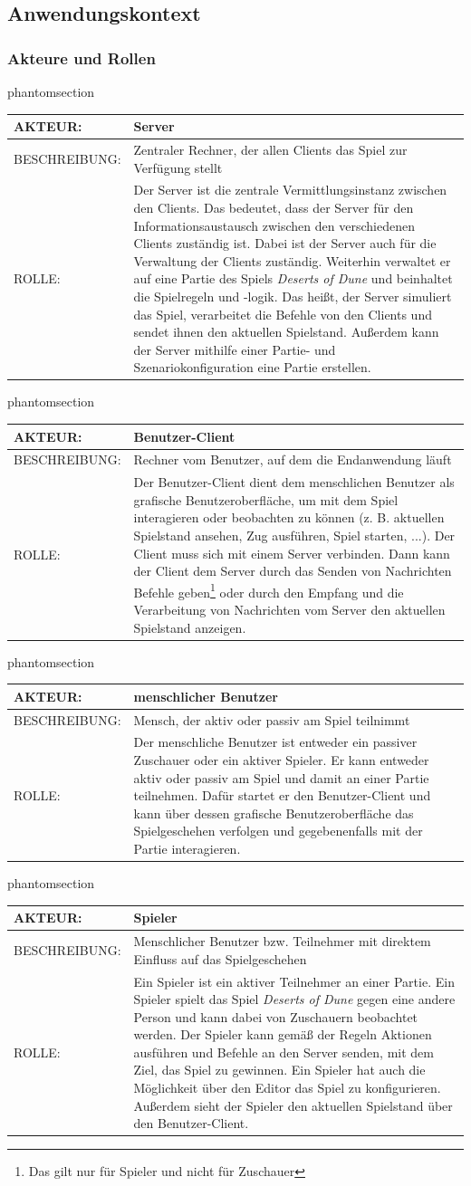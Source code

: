 \documentclass[12pt]{article}
\makeatletter
\newcommand{\labeltext}[2]{%
  \@bsphack
  \csname phantomsection\endcsname %
  \def\@currentlabel{#1}{\label{#2}}%
  \@esphack
}
\newcounter{fa}
\newcounter{nfa}
\newcommand{\akteur}[4]{
\labeltext{#2}{#1}
\begin{tabularx}{16cm}{|l|X|}
\hline 
AKTEUR: & #2 \\
\hline
BESCHREIBUNG: & #3 \\
\hline
ROLLE: & #4 \\ 
\hline
\end{tabularx}
}
\makeatother
\begin{document}
\subsection{Anwendungskontext}
\subsubsection{Akteure und Rollen}

\akteur{A-Server}{Server}{Zentraler Rechner, der allen Clients das Spiel zur Verfügung stellt}{Der Server ist die zentrale Vermittlungsinstanz zwischen den Clients. Das bedeutet, dass der Server für den Informationsaustausch zwischen den verschiedenen Clients zuständig ist. Dabei ist der Server auch für die Verwaltung der Clients zuständig. Weiterhin verwaltet er auf eine Partie des Spiels \textit{Deserts of Dune} und beinhaltet die Spielregeln und -logik. Das heißt, der Server simuliert das Spiel, verarbeitet die Befehle von den Clients und sendet ihnen den aktuellen Spielstand. Außerdem kann der Server mithilfe einer Partie- und Szenariokonfiguration eine Partie erstellen.}

\akteur{A-Benutzer-Client}{Benutzer-Client}{Rechner vom Benutzer, auf dem die Endanwendung läuft}{Der Benutzer-Client dient dem menschlichen Benutzer als grafische Benutzeroberfläche, um mit dem Spiel interagieren oder beobachten zu können (z. B. aktuellen Spielstand ansehen, Zug ausführen, Spiel starten, ...). Der Client muss sich mit einem Server verbinden. Dann kann der Client dem Server durch das Senden von Nachrichten Befehle geben\footnote{Das gilt nur für Spieler und nicht für Zuschauer} oder durch den Empfang und die Verarbeitung von Nachrichten vom Server den aktuellen Spielstand anzeigen.}

\akteur{A-Benutzer}{menschlicher Benutzer}{Mensch, der aktiv oder passiv am Spiel teilnimmt}{Der menschliche Benutzer ist entweder ein passiver Zuschauer oder ein aktiver Spieler. Er kann entweder aktiv oder passiv am Spiel und damit an einer Partie teilnehmen. Dafür startet er den Benutzer-Client und kann über dessen grafische Benutzeroberfläche das Spielgeschehen verfolgen und gegebenenfalls mit der Partie interagieren.}

\akteur{A-Spieler}{Spieler}{Menschlicher Benutzer bzw. Teilnehmer mit direktem Einfluss auf das Spielgeschehen}{Ein Spieler ist ein aktiver Teilnehmer an einer Partie. Ein Spieler spielt das Spiel \textit{Deserts of Dune} gegen eine andere Person und kann dabei von Zuschauern beobachtet werden. Der Spieler kann gemäß der Regeln Aktionen ausführen und Befehle an den Server senden, mit dem Ziel, das Spiel zu gewinnen. Ein Spieler hat auch die Möglichkeit über den Editor das Spiel zu konfigurieren. Außerdem sieht der Spieler den aktuellen Spielstand über den Benutzer-Client.}
\end{document}
